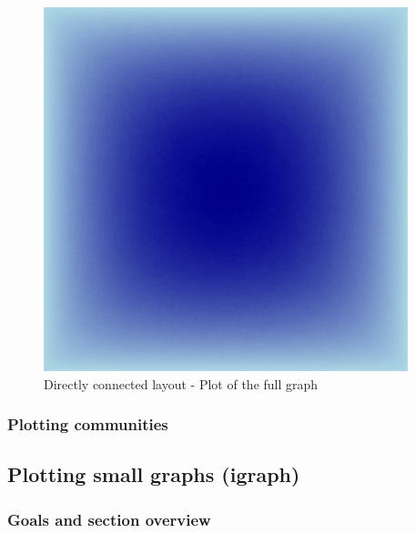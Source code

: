 \documentclass[12pt, a4paper]{article}
\begin{document}
\begin{figure}
    \centering
    \includegraphics[width=\textwidth]{src/youtube/datashader/simple/fullgraph}
    \caption{Directly connected layout - Plot of the full graph}
    \label{fig:ds_fullgraph}
\end{figure}

\subsubsection{Plotting communities}



\newpage
\subsection{Plotting small graphs (igraph)}
\subsubsection{Goals and section overview}
\end{document}
